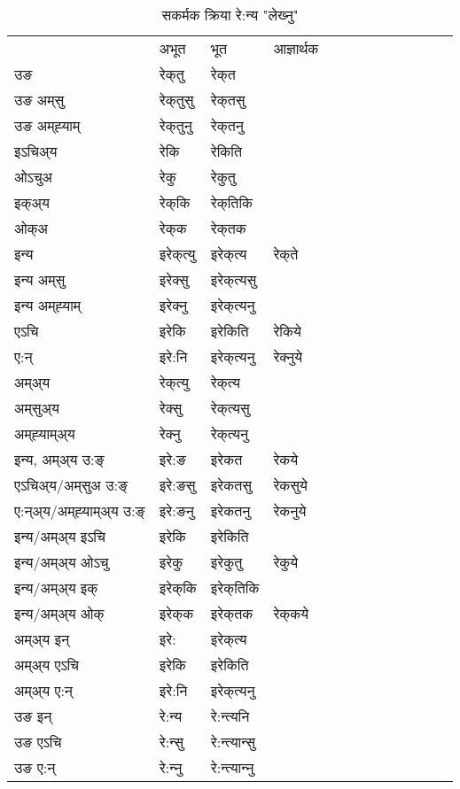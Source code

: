 \begin{table}[H]
\centering
\caption{\label{ekt.vt} सकर्मक क्रिया  रे:न्य  "लेख्‍नु"  }
\begin{tabular}{l|l|l|l|l|l|l|l|l|l|l|l|l}  \toprule
&अभूत & भूत & आज्ञार्थक \\ 
उङ &रेक्‌तु &रेक्‌त \\ 
उङ अम्‌सु&रेक्‌तुसु &रेक्‌तसु \\ 
उङ अम्‌ह्‍याम्&रेक्‌तुनु &रेक्‌तनु \\ 
इऽचिअ्य &रेकि &रेकिति   \\ 
ओऽचुअ        &रेकु &रेकुतु   \\ 
इक्अ्य&रेक्‌कि &रेक्‌तिकि   \\ 
ओक्अ &रेक्‌क &रेक्‌तक   \\ 
इन्य & इरेक्‌त्यु  & इरेक्‌त्य &रेक्‌ते  \\ 
इन्य अम्‌सु& इरेक्सु  & इरेक्‌त्यसु   \\ 
इन्य अम्‌ह्‍याम्& इरेक्‍नु  & इरेक्‌त्यनु   \\ 
एऽचि & इरेकि & इरेकिति &रेकिये    \\ 
ए:न् & इरे:नि  & इरेक्‌त्यनु &रेक्‍नुये  \\ 
अम्अ्य & रेक्‌त्यु  & रेक्‌त्य  \\ 
अम्‌सुअ्य & रेक्सु & रेक्‌त्यसु  \\ 
अम्‌ह्‍याम्अ्य & रेक्‍नु  & रेक्‌त्यनु \\ 
\midrule
इन्य, अम्अ्य उ:ङ्‌ &इरे:ङ &इरेकत &रेकये \\ 
एऽचिअ्य/अम्‌सुअ उ:ङ्‌ &इरे:ङसु &इरेकतसु &रेकसुये \\ 
ए:न्अ्य/अम्‌ह्‍याम्अ्य उ:ङ्‌ &इरे:ङनु &इरेकतनु &रेकनुये \\ 
इन्य/अम्अ्य इऽचि &इरेकि &इरेकिति    \\ 
इन्य/अम्अ्य ओऽचु &इरेकु &इरेकुतु  &रेकुये  \\ 
इन्य/अम्अ्य इक् &इरेक्‌कि &इरेक्‌तिकि   \\ 
इन्य/अम्अ्य ओक् &इरेक्‌क &इरेक्‌तक  &रेक्‌कये  \\ 
अम्अ्य इन् & इरे: & इरेक्‌त्य   \\ 
अम्अ्य एऽचि & इरेकि & इरेकिति    \\ 
अम्अ्य ए:न् & इरे:नि  & इरेक्‌त्यनु  \\ 
\midrule
उङ इन् & रे:न्य  & रे:न्त्यनि  \\ 
उङ एऽचि & रे:न्सु  & रे:न्त्यान्सु   \\ 
उङ ए:न्& रे:न्‍नु  & रे:न्त्यान्‍नु   \\ 
\bottomrule
\end{tabular}
\end{table}


